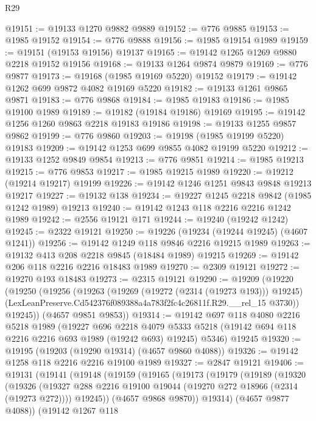 \begin{lexlean}{R29}
\begin{coremodule}
@19151 := @19133 @1270 @9882 @9889
@19152 := @776 @9885
@19153 := @1985 @19152
@19154 := @776 @9888
@19156 := @1985 @19154 @1989
@19159 := @19151 (@19153 @19156) @19137
@19165 := @19142 @1265 @1269 @9880 @2218 @19152 @19156
@19168 := @19133 @1264 @9874 @9879
@19169 := @776 @9877
@19173 := @19168 (@1985 @19169 @5220) @19152
@19179 := @19142 @1262 @699 @9872 @4082 @19169 @5220
@19182 := @19133 @1261 @9865 @9871
@19183 := @776 @9868
@19184 := @1985 @19183
@19186 := @1985 @19100 @1989
@19189 := @19182 (@19184 @19186) @19169
@19195 := @19142 @1256 @1260 @9863 @2218 @19183 @19186
@19198 := @19133 @1255 @9857 @9862
@19199 := @776 @9860
@19203 := @19198 (@1985 @19199 @5220) @19183
@19209 := @19142 @1253 @699 @9855 @4082 @19199 @5220
@19212 := @19133 @1252 @9849 @9854
@19213 := @776 @9851
@19214 := @1985 @19213
@19215 := @776 @9853
@19217 := @1985 @19215 @1989
@19220 := @19212 (@19214 @19217) @19199
@19226 := @19142 @1246 @1251 @9843 @9848 @19213 @19217
@19227 := @19132 @138
@19234 := @19227 @1245 @2218 @9842 (@1985 @1242 @1989) @19213
@19240 := @19142 @1243 @118 @2216 @2216 @1242 @1989
@19242 := @2556 @19121 @171
@19244 := @19240 (@19242 @1242)
@19245 := @2322 @19121
@19250 := @19226 (@19234 (@19244 @19245) (@4607 @1241))
@19256 := @19142 @1249 @118 @9846 @2216 @19215 @1989
@19263 := @19132 @413 @208 @2218 @9845 (@18484 @1989) @19215
@19269 := @19142 @206 @118 @2216 @2216 @18483 @1989
@19270 := @2309 @19121
@19272 := @19270 @193 @18483
@19273 := @2315 @19121
@19290 := @19209
    (@19220
      (@19250
        (@19256
          (@19263
            (@19269 (@19272 (@2314 (@19273 @193))) @19245)
            (LexLeanPreserve.Cd542376f089388a4a783f2fc4c26811f.R29.__rel_15 @3730))
          @19245))
      (@4657 @9851 @9853))
@19314 := @19142
    @697
    @118
    @4080
    @2216
    @5218
    @1989
    (@19227
      @696
      @2218
      @4079
      @5333
      @5218
      (@19142 @694 @118 @2216 @2216 @693 @1989 (@19242 @693) @19245)
      @5346)
    @19245
@19320 := @19195 (@19203 (@19290 @19314) (@4657 @9860 @4088))
@19326 := @19142 @1258 @118 @2216 @2216 @19100 @1989
@19327 := @2847 @19121
@19406 := @19131
    (@19141
      (@19148
        (@19159
          (@19165
            (@19173
              (@19179
                (@19189
                  (@19320
                    (@19326
                      (@19327 @288 @2216 @19100 @19044 (@19270 @272 @18966 (@2314 (@19273 @272))))
                      @19245))
                  (@4657 @9868 @9870))
                @19314)
              (@4657 @9877 @4088))
            (@19142
              @1267
              @118

\end{coremodule}
\end{lexlean}
